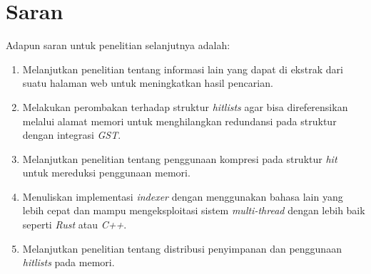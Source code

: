 \section{Saran}

Adapun saran untuk penelitian selanjutnya adalah:
\begin{enumerate} 
	\item{Melanjutkan penelitian tentang informasi lain yang dapat di ekstrak dari 
		suatu halaman web untuk meningkatkan hasil pencarian.}
	\item{Melakukan perombakan terhadap struktur \textit{hitlists} agar bisa 
		direferensikan melalui alamat memori untuk menghilangkan redundansi pada 
		struktur dengan integrasi \textit{GST}.}
	\item{Melanjutkan penelitian tentang penggunaan kompresi pada struktur
		\textit{hit} untuk mereduksi penggunaan memori.}
	\item{Menuliskan implementasi \textit{indexer} dengan menggunakan bahasa lain 
		yang lebih cepat dan mampu mengeksploitasi sistem \textit{multi-thread} 
		dengan lebih baik seperti \textit{Rust} atau \textit{C++}.}
	\item{Melanjutkan penelitian tentang distribusi penyimpanan dan penggunaan 
		\textit{hitlists} pada memori.}
\end{enumerate}


\begin{comment}

\end{comment}
